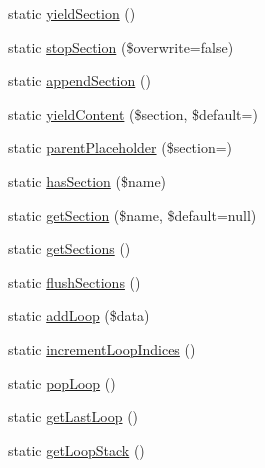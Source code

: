 \begin{DoxyCompactItemize}
static \mbox{\hyperlink{class_illuminate_1_1_support_1_1_facades_1_1_view_a48ea596ef23c95708e95a1d40845b24d}{yield\+Section}} ()
\item 
static \mbox{\hyperlink{class_illuminate_1_1_support_1_1_facades_1_1_view_a45915b47e73f64242baf0989f43480a9}{stop\+Section}} (\$overwrite=false)
\item 
static \mbox{\hyperlink{class_illuminate_1_1_support_1_1_facades_1_1_view_a3a682ca23c58735385e5b78a9edc9402}{append\+Section}} ()
\item 
static \mbox{\hyperlink{class_illuminate_1_1_support_1_1_facades_1_1_view_a31c4da9b5159f0e3fcd316524a61b569}{yield\+Content}} (\$section, \$default=\textquotesingle{}\textquotesingle{})
\item 
static \mbox{\hyperlink{class_illuminate_1_1_support_1_1_facades_1_1_view_acb9e03e7d83bb99833bc0385ab333052}{parent\+Placeholder}} (\$section=\textquotesingle{}\textquotesingle{})
\item 
static \mbox{\hyperlink{class_illuminate_1_1_support_1_1_facades_1_1_view_ac6d8d7c008064936c930ef4e8b7802ed}{has\+Section}} (\$name)
\item 
static \mbox{\hyperlink{class_illuminate_1_1_support_1_1_facades_1_1_view_a232a2ca414bce7cb01b620db1ae9f983}{get\+Section}} (\$name, \$default=null)
\item 
static \mbox{\hyperlink{class_illuminate_1_1_support_1_1_facades_1_1_view_abf3fe3db6ab92b62f8d6f7f6b676d44c}{get\+Sections}} ()
\item 
static \mbox{\hyperlink{class_illuminate_1_1_support_1_1_facades_1_1_view_a4b965a27a3ec004cba4c196d3dca9154}{flush\+Sections}} ()
\item 
static \mbox{\hyperlink{class_illuminate_1_1_support_1_1_facades_1_1_view_ad15f790d59702e1406dfaf6ae221e987}{add\+Loop}} (\$data)
\item 
static \mbox{\hyperlink{class_illuminate_1_1_support_1_1_facades_1_1_view_a87538c617f8d9da92e88ea488642a92a}{increment\+Loop\+Indices}} ()
\item 
static \mbox{\hyperlink{class_illuminate_1_1_support_1_1_facades_1_1_view_a8f3ca43448a501f325f0f099f055b846}{pop\+Loop}} ()
\item 
static \mbox{\hyperlink{class_illuminate_1_1_support_1_1_facades_1_1_view_a08e763d50f0485dde6af282a5e774cb3}{get\+Last\+Loop}} ()
\item 
static \mbox{\hyperlink{class_illuminate_1_1_support_1_1_facades_1_1_view_a60704b1ae5cd25a171888d237ff66700}{get\+Loop\+Stack}} ()
\item 

\end{DoxyCompactItemize}
